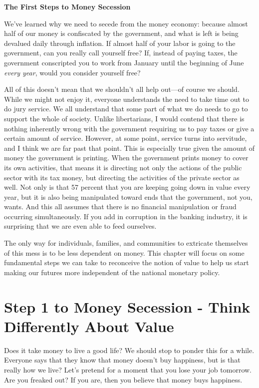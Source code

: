 \documentclass[letterpaper]{article}
\title{}
\begin{document}
\clearpage\setcounter{page}{1}\pagestyle{Standard}
{\centering{}\bfseries\color{black}
The First Steps to Money Secession
\par}

{\color{black}
We’ve learned why we need to secede from the money economy:
\textcolor[rgb]{0.32941177,0.5529412,0.83137256}{because }almost half
of our money is confiscated by the government, and what is left is
being devalued daily through inflation. If almost half of your labor is
going to the government, can you really call yourself free?  If,
instead of paying taxes, the government conscripted you to work from
January until the beginning of June \textit{every year}, would you
consider yourself free?}

{\color{black}
\textcolor[rgb]{0.32941177,0.5529412,0.83137256}{All of this} doesn’t
mean that we shouldn’t all help out—of course we should. While we might
not enjoy it, everyone understands the need to take time out to do jury
service. We all understand that some part of what we do needs to go to
support the whole of society. Unlike libertarians, I would contend that
there is nothing inherently wrong with the government requiring us to
pay taxes or give a certain amount of service. However, at some point,
service turns into servitude, and I think we are far past that point.
This is especially true given the amount of money the government is
printing. When the government prints money to cover its own activities,
that means it is directing not only the actions of the public sector
with its tax money, but directing the activities of the private sector
as well. Not only is that 57 percent that you are keeping going down in
value every year, but it is also being manipulated toward ends that the
government, not you, wants.  And this all assumes that there is no
financial manipulation or fraud occurring simultaneously.  If you add
in corruption in the banking industry, it is surprising that we are
even able to feed ourselves.}

{\color{black}
The only way for individuals, families, and communities to extricate
themselves of this mess is to be less dependent on money. This chapter
will focus on some fundamental steps we can take to reconceive the
notion of value to help us start making our futures more independent of
the national monetary policy.}

\section[Step 1 to Money Secession {}- Think Differently About
Value]{Step 1 to Money Secession - Think Differently About Value}
{\color{black}
Does it take money to live a good life?  We should stop to ponder this
for a while. Everyone says that they know that money doesn’t buy
happiness, but is that really how we live? Let’s pretend for a moment
that you lose your job tomorrow. Are you freaked out?  If you are, then
you believe that money buys happiness. }
\end{document}
